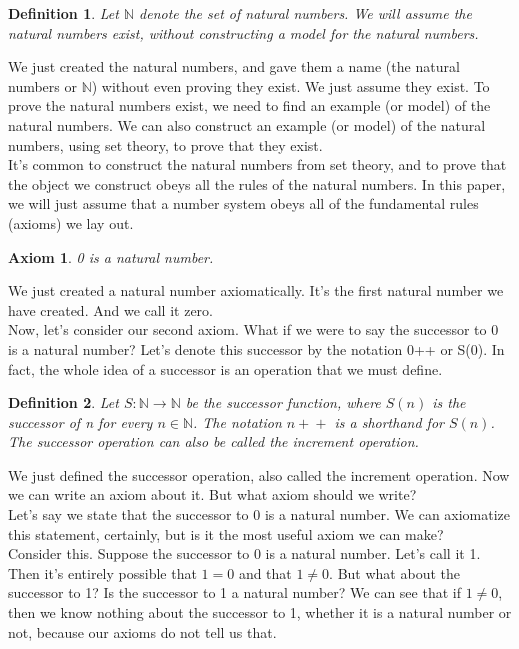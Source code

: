 \documentclass{article}
\newtheorem{axiom}{Axiom}
\newtheorem{definition}{Definition}
\newcommand{\inc}[1]{\mathrel{{{#1}+}+}}
\begin{document}
\begin{definition}
Let $\mathbb{N}$ denote the set of natural numbers. We will assume the natural numbers exist, without constructing a model for the natural numbers.
\end{definition}

We just created the natural numbers, and gave them a name (the natural numbers or $\mathbb{N}$) without even proving they exist. We just assume they exist. To prove the natural numbers exist, we need to find an example (or model) of the natural numbers. We can also construct an example (or model) of the natural numbers, using set theory, to prove that they exist. \\

It's common to construct the natural numbers from set theory, and to prove that the object we construct obeys all the rules of the natural numbers. In this paper, we will just assume that a number system obeys all of the fundamental rules (axioms) we lay out.

\begin{axiom}
0 is a natural number.
\end{axiom}

We just created a natural number axiomatically. It's the first natural number we have created. And we call it zero. \\

Now, let's consider our second axiom. What if we were to say the successor to 0 is a natural number? Let's denote this successor by the notation 0++ or S(0). In fact, the whole idea of a successor is an operation that we must define.

\begin{definition}
Let $S : \mathbb{N} \to \mathbb{N}$ be the successor function, where $S(n)$ is the successor of n for every $n \in \mathbb{N}$. The notation $\inc{n}$ is a shorthand for $S(n)$. The successor operation can also be called the increment operation.
\end{definition}

We just defined the successor operation, also called the increment operation. Now we can write an axiom about it. But what axiom should we write? \\

Let's say we state that the successor to 0 is a natural number. We can axiomatize this statement, certainly, but is it the most useful axiom we can make? \\

Consider this. Suppose the successor to 0 is a natural number. Let's call it 1. Then it's entirely possible that $1 = 0$ and that $1 \neq 0$. But what about the successor to 1? Is the successor to 1 a natural number? We can see that if $1 \neq 0$, then we know nothing about the successor to 1, whether it is a natural number or not, because our axioms do not tell us that. \\
\end{document}
